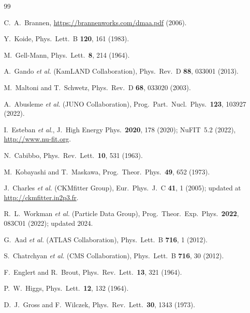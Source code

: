 \documentclass[aps,prd,twocolumn,superscriptaddress,nofootinbib,longbibliography]{revtex4-2}
\begin{document}
\begin{thebibliography}{99}

C.~A.~Brannen,
\url{https://brannenworks.com/dmaa.pdf} (2006).


Y.~Koide,
Phys.\ Lett.\ B \textbf{120}, 161 (1983).

M.~Gell-Mann,
Phys.\ Lett.\ \textbf{8}, 214 (1964).


A.~Gando \textit{et al.} (KamLAND Collaboration),
Phys.\ Rev.\ D \textbf{88}, 033001 (2013).

M.~Maltoni and T.~Schwetz,
Phys.\ Rev.\ D \textbf{68}, 033020 (2003).

A.~Abusleme \textit{et al.} (JUNO Collaboration),
Prog.\ Part.\ Nucl.\ Phys.\ \textbf{123}, 103927 (2022).

I.~Esteban \textit{et al.},
J.\ High Energy Phys.\ \textbf{2020}, 178 (2020);
NuFIT~5.2 (2022), \url{http://www.nu-fit.org}.

N.~Cabibbo,
Phys.\ Rev.\ Lett.\ \textbf{10}, 531 (1963).

M.~Kobayashi and T.~Maskawa,
Prog.\ Theor.\ Phys.\ \textbf{49}, 652 (1973).


J.~Charles \textit{et al.} (CKMfitter Group),
Eur.\ Phys.\ J.\ C \textbf{41}, 1 (2005);
updated at \url{http://ckmfitter.in2p3.fr}.

R.~L.~Workman \textit{et al.} (Particle Data Group),
Prog.\ Theor.\ Exp.\ Phys.\ \textbf{2022}, 083C01 (2022);
updated 2024.

G.~Aad \textit{et al.} (ATLAS Collaboration),
Phys.\ Lett.\ B \textbf{716}, 1 (2012).

S.~Chatrchyan \textit{et al.} (CMS Collaboration),
Phys.\ Lett.\ B \textbf{716}, 30 (2012).

F.~Englert and R.~Brout,
Phys.\ Rev.\ Lett.\ \textbf{13}, 321 (1964).

P.~W.~Higgs,
Phys.\ Lett.\ \textbf{12}, 132 (1964).


D.~J.~Gross and F.~Wilczek,
Phys.\ Rev.\ Lett.\ \textbf{30}, 1343 (1973).


\end{thebibliography}
\end{document}
